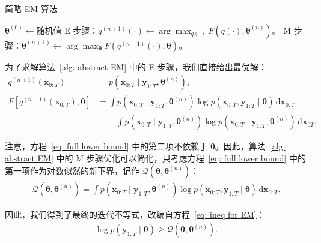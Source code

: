 \begin{algorithm}[tb]
    \caption{简略 EM 算法}
    \label{alg: abstract EM}
    \begin{algorithmic}[1]
        \STATE \(\boldsymbol{\theta}^{(0)} \gets \text{随机值}\)
            \STATE E 步骤：\(q^{(n+1)}(\cdot) \gets \arg \max_{q(\cdot)} F(q(\cdot), \boldsymbol{\theta}^{(n)})\)。
            \STATE M 步骤：\(\boldsymbol{\theta}^{(n+1)} \gets \arg \max_{\boldsymbol{\theta}} F(q^{(n+1)}(\cdot), \boldsymbol{\theta})\)。
        \ENDFOR
    \end{algorithmic}
\end{algorithm}

为了求解算法~\ref{alg: abstract EM} 中的 E 步骤，我们直接给出最优解：
\begin{align}
    q^{(n+1)}(\mathbf{x}_{0:T}) &= p(\mathbf{x}_{0:T} \mid \mathbf{y}_{1:T}, \boldsymbol{\theta}^{(n)}), \\
    F[q^{(n+1)}(\mathbf{x}_{0:T}), \boldsymbol{\theta}] &= \int p(\mathbf{x}_{0:T} \mid \mathbf{y}_{1:T}, \boldsymbol{\theta}^{(n)}) \log p(\mathbf{x}_{0:T}, \mathbf{y}_{1:T} \mid \boldsymbol{\theta}) \, \mathrm{d} \mathbf{x}_{0:T} \label{eq: full lower bound} \\
    &\quad - \int p(\mathbf{x}_{0:T} \mid \mathbf{y}_{1:T}, \boldsymbol{\theta}^{(n)}) \log p(\mathbf{x}_{0:T} \mid \mathbf{y}_{1:T}, \boldsymbol{\theta}^{(n)}) \, \mathrm{d} \mathbf{x}_{0{T}}. \nonumber
\end{align}

注意，方程~\eqref{eq: full lower bound} 中的第二项不依赖于 \(\boldsymbol{\theta}\)。因此，算法~\ref{alg: abstract EM} 中的 M 步骤优化可以简化，只考虑方程~\eqref{eq: full lower bound} 中的第一项作为对数似然的新下界，记作 \(\mathcal{Q}(\boldsymbol{\theta}, \boldsymbol{\theta}^{(n)})\)：
\begin{align*}
    \mathcal{Q}(\boldsymbol{\theta}, \boldsymbol{\theta}^{(n)}) = \int p(\mathbf{x}_{0:T} \mid \mathbf{y}_{1:T}, \boldsymbol{\theta}^{(n)}) \log p(\mathbf{x}_{0:T}, \mathbf{y}_{1:T} \mid \boldsymbol{\theta}) \, \mathrm{d} \mathbf{x}_{0:T}.
\end{align*}

因此，我们得到了最终的迭代不等式，改编自方程~\eqref{eq: ineq for EM}：
\begin{align}
    \log p(\mathbf{y}_{1:T} \mid \boldsymbol{\theta}) \ge \mathcal{Q}(\boldsymbol{\theta}, \boldsymbol{\theta}^{(n)}). \label{eq: ineq for EM final}
\end{align}

